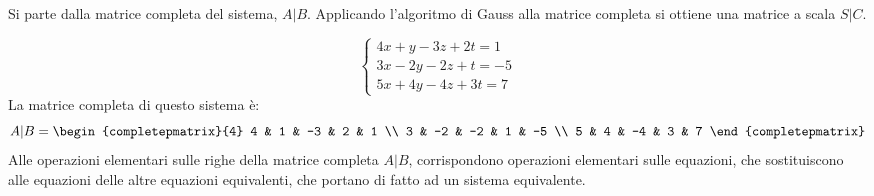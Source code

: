 Si parte dalla matrice completa del sistema, $A | B$. Applicando l'algoritmo di Gauss alla matrice completa si ottiene una matrice a scala $S | C$.

\begin{exmp}
\[
\begin{cases}
4 x + y - 3z + 2t = 1 \\
3x - 2y - 2z + t = -5 \\
5x + 4y - 4z + 3t = 7
\end{cases}
\]
La matrice completa di questo sistema \`e:
\[
A | B = 
\begin{completepmatrix}{4}
4 & 1 & -3 & 2 & 1 \\
3 & -2 & -2 & 1 & -5 \\
5 & 4 & -4 & 3 & 7
\end{completepmatrix}
\]
Alle operazioni elementari sulle righe della matrice completa $A | B$, corrispondono operazioni elementari sulle equazioni, che sostituiscono alle equazioni delle altre equazioni equivalenti, che portano di fatto ad un sistema equivalente.


\end{exmp}
